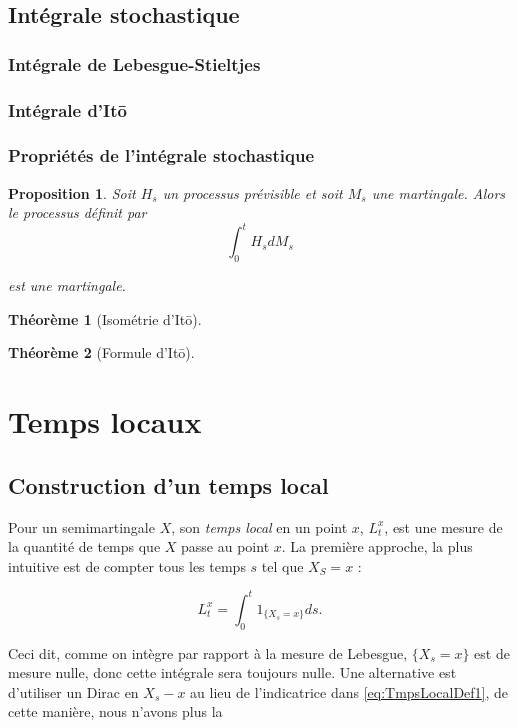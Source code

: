 \documentclass[openany]{book}
\theoremstyle{thmfont}
\newtheorem{theorem}{Théorème}[chapter]
\theoremstyle{deffont}
\theoremstyle{thmfont}
\newtheorem{prop}[prop]{Proposition}
\theoremstyle{deffont}
\begin{document}
\section{Intégrale stochastique}  
\subsection{Intégrale de Lebesgue-Stieltjes}
\subsection{Intégrale d'Itō}
\subsection{Propriétés de l'intégrale stochastique}
{\color{red}
\begin{prop}
  Soit $H_s$ un processus prévisible et soit $M_s$ une martingale. Alors le processus définit par 
  $$\int_0^t H_s dM_s$$

  est une martingale.
\end{prop}
}

{\color{red}
\begin{theorem}[Isométrie d'Itō]
\end{theorem}

\begin{theorem}[Formule d'Itō]  
\end{theorem}
}

\chapter{Temps locaux}
\section{Construction d'un temps local}\label{sec:ConstrTempsLoc}

Pour un semimartingale $X$, son \textit{temps local} en un point $x$, $L_t^x$, est une mesure de la quantité de temps que $X$ passe au point $x$. La première approche, la plus intuitive est de compter tous les temps $s$ tel que $X_S = x$ :

\begin{equation}
  \label{eq:TmpsLocalDef1}
   L^x_t= \int_0^t1_{\{X_s=x\}}ds.
  \end{equation}

  Ceci dit, comme on intègre par rapport à la mesure de Lebesgue, $\{X_s = x\}$ est de mesure nulle, donc cette intégrale sera toujours nulle. Une alternative est d'utiliser un Dirac en $X_s - x$ au lieu de l'indicatrice dans \eqref{eq:TmpsLocalDef1}, de cette manière, nous n'avons plus la 
\end{document}
